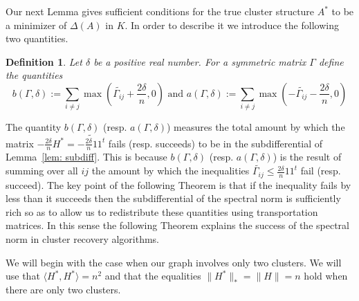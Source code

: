 \documentclass[12pt]{amsart}
\newtheorem{definition}[lemma]{Definition}
\theoremstyle{remark}
\begin{document}
Our next Lemma gives sufficient conditions for the true cluster structure $A^*$ to be a minimizer of $\Delta(A)$ in $K$. In order to describe it we introduce the following two quantities. 

\begin{definition} Let $\delta$ be a positive real number. For a symmetric matrix $\Gamma$ define the quantities
\[b(\Gamma,\delta):=\sum_{i\neq j} \max\left(\widetilde{\Gamma_{ij}}+\frac{2\delta}{n},0\right)
\text{ and } a(\Gamma, \delta):=\sum_{i\neq j} \max\left(-\widetilde{\Gamma_{ij}}-\frac{2\delta}{n},0\right)
\]\end{definition}
The quantity $b(\Gamma, \delta)$ (resp. $a(\Gamma, \delta)$) measures the total amount by which the matrix $-\frac{2\delta}{n}H^*=\widetilde{-\frac{2\delta}{n}11^t}$ fails (resp. succeeds) to be in the subdifferential of Lemma~\ref{lem: subdiff}. This is because $b(\Gamma,\delta)$ (resp. $a(\Gamma,\delta)$) is the result of summing over all $ij$ the amount by which the inequalities $\widetilde{\Gamma_{ij}}\leq \frac{2\delta}{n} 11^t$ fail (resp. succeed). The key point of the following Theorem is that if the inequality fails by less than it succeeds then the subdifferential of the spectral norm is sufficiently rich so as to allow us to redistribute these quantities using transportation matrices. In this sense the following Theorem explains the success of the spectral norm in cluster recovery algorithms.

 
We will begin with the case when our graph involves only two clusters. We will use that $\langle H^*,H^*\rangle= n^2$ and that the equalities $\|H^*\|_*=\|H\|=n$ hold  when there are only two clusters.
\end{document}

